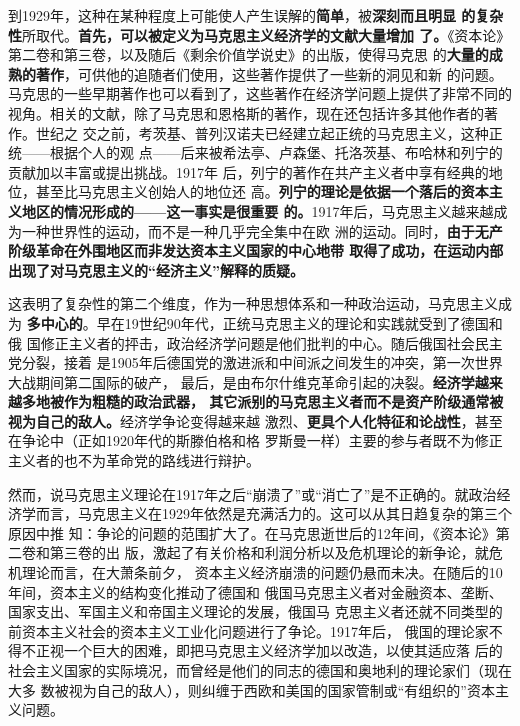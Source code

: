 到1929年，这种在某种程度上可能使人产生误解的\textbf{简单}，被\textbf{深刻而且明显
  的复杂性}所取代。\textbf{首先，可以被定义为马克思主义经济学的文献大量增加
  了。}《资本论》第二卷和第三卷，以及随后《剩余价值学说史》的出版，使得马克思
的\textbf{大量的成熟的著作}，可供他的追随者们使用，这些著作提供了一些新的洞见和新
的问题。马克思的一些早期著作也可以看到了，这些著作在经济学问题上提供了非常不同的
视角。相关的文献，除了马克思和恩格斯的著作，现在还包括许多其他作者的著作。世纪之
交之前，考茨基、普列汉诺夫已经建立起正统的马克思主义，这种正统——根据个人的观
点——后来被希法亭、卢森堡、托洛茨基、布哈林和列宁的贡献加以丰富或提出挑战。1917年
后，列宁的著作在共产主义者中享有经典的地位，甚至比马克思主义创始人的地位还
高。\textbf{列宁的理论是依据一个落后的资本主义地区的情况形成的——这一事实是很重要
  的。}1917年后，马克思主义越来越成为一种世界性的运动，而不是一种几乎完全集中在欧
洲的运动。同时，\textbf{由于无产阶级革命在外围地区而非发达资本主义国家的中心地带
  取得了成功，在运动内部出现了对马克思主义的“经济主义”解释的质疑。}

这表明了复杂性的第二个维度，作为一种思想体系和一种政治运动，马克思主义成为
\textbf{多中心的}。早在19世纪90年代，正统马克思主义的理论和实践就受到了德国和俄
国修正主义者的抨击，政治经济学问题是他们批判的中心。随后俄国社会民主党分裂，接着
是1905年后德国党的激进派和中间派之间发生的冲突，第一次世界大战期间第二国际的破产，
最后，是由布尔什维克革命引起的决裂。\textbf{经济学越来越多地被作为粗糙的政治武器，
其它派别的马克思主义者而不是资产阶级通常被视为自己的敌人。}经济学争论变得越来越
激烈、\textbf{更具个人化特征和论战性}，甚至在争论中（正如1920年代的斯滕伯格和格
罗斯曼一样）主要的参与者既不为修正主义者的也不为革命党的路线进行辩护。

然而，说马克思主义理论在1917年之后“崩溃了”或“消亡了”是不正确的。就政治经
济学而言，马克思主义在1929年依然是充满活力的。这可以从其日趋复杂的第三个原因中推
知：争论的问题的范围扩大了。在马克思逝世后的12年间，《资本论》第二卷和第三卷的出
版，激起了有关价格和利润分析以及危机理论的新争论，就危机理论而言，在大萧条前夕，
资本主义经济崩溃的问题仍悬而未决。在随后的10年间，资本主义的结构变化推动了德国和
俄国马克思主义者对金融资本、垄断、国家支出、军国主义和帝国主义理论的发展，俄国马
克思主义者还就不同类型的前资本主义社会的资本主义工业化问题进行了争论。1917年后，
俄国的理论家不得不正视一个巨大的困难，即把马克思主义经济学加以改造，以使其适应落
后的社会主义国家的实际境况，而曾经是他们的同志的德国和奥地利的理论家们（现在大多
数被视为自己的敌人），则纠缠于西欧和美国的国家管制或“有组织的”资本主义问题。

